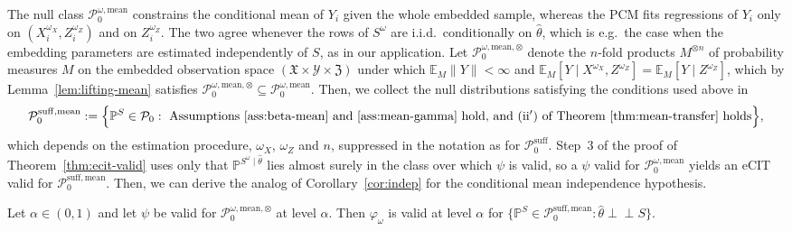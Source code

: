 \documentclass[twoside,11pt]{article}
\newcommand{\indep}{\perp \!\!\! \perp}
\begin{document}
The null class $\mathcal P_0^{\omega,\mathrm{mean}}$ constrains the conditional mean of $Y_i$ given the whole embedded sample, whereas the PCM
fits regressions of $Y_i$ only on $(X^{\omega_X}_i,Z^{\omega_Z}_i)$ and on $Z^{\omega_Z}_i$. 
The two agree whenever the rows of $S^\omega$ are i.i.d.\ conditionally on $\hat\theta$, which is e.g.\ the case when the embedding parameters are estimated independently of $S$, as in our application. 
Let $\mathcal P_0^{\omega,\mathrm{mean},\otimes}$ denote the $n$-fold products $M^{\otimes n}$ of probability measures $M$ on the embedded observation space $(\mathfrak X\times\mathcal Y\times\mathfrak Z)$ under which $\mathbb E_M\|Y\|<\infty$ and $\mathbb E_M[Y\mid X^{\omega_X},Z^{\omega_Z}]=\mathbb E_M[Y\mid Z^{\omega_Z}]$, which by Lemma~\ref{lem:lifting-mean} satisfies $\mathcal P_0^{\omega,\mathrm{mean},\otimes}\subseteq\mathcal P_0^{\omega,\mathrm{mean}}$. Then, we collect the null distributions satisfying the conditions used above in
\begin{align*}
    \mathcal P_0^{\mathrm{suff,mean}}:=\Big\{\mathbb P^{S}\in\mathcal P_0:\ \text{Assumptions~\ref{ass:beta-mean} and \ref{ass:mean-gamma} hold, and (ii$'$) of Theorem~\ref{thm:mean-transfer} holds}\Big\},
\end{align*}
which depends on the estimation procedure, $\omega_X$, $\omega_Z$ and $n$, suppressed in
the notation as for $\mathcal P_0^{\mathrm{suff}}$. 
Step~3 of the proof of Theorem~\ref{thm:ecit-valid} uses only that $\mathbb P^{S^\omega\mid\hat\theta}$ lies almost surely in the class over which $\psi$ is valid, so a $\psi$ valid for $\mathcal P_0^{\omega,\mathrm{mean}}$ yields an eCIT valid for $\mathcal P_0^{\mathrm{suff,mean}}$.
Then, we can derive the analog of Corollary~\ref{cor:indep} for the conditional mean independence hypothesis.

\begin{corollaryE}
\label{cor:mean-iid}
Let $\alpha\in(0,1)$ and let $\psi$ be valid for $\mathcal P_0^{\omega,\mathrm{mean},\otimes}$ at level $\alpha$. Then $\varphi_\omega$ is valid at level $\alpha$ for $\{\mathbb P^{S}\in\mathcal P_0^{\mathrm{suff,mean}}:\hat\theta\indep S\}$.
\end{corollaryE}
\end{document}
